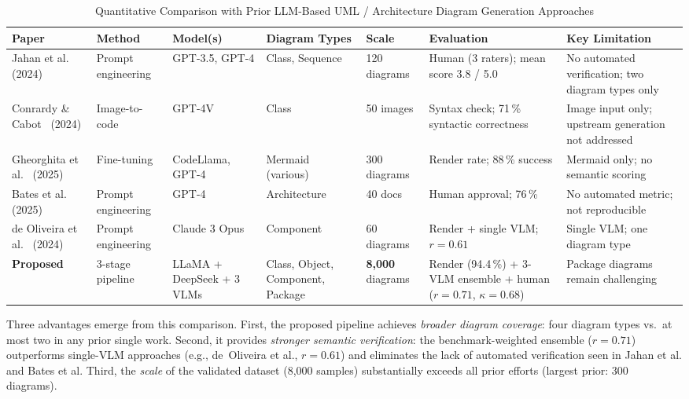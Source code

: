 \documentclass[conference]{IEEEtran}
\begin{document}
\begin{table}[!t]
\caption{Quantitative Comparison with Prior LLM-Based UML / Architecture Diagram Generation Approaches}
\label{tab:comparison}
\renewcommand{\arraystretch}{1.25}
\centering
\begin{tabular}{L{2.4cm}L{2.2cm}L{2.0cm}L{1.8cm}L{1.8cm}L{3.2cm}L{2.4cm}}
\toprule
\textbf{Paper} & \textbf{Method} & \textbf{Model(s)} &
\textbf{Diagram Types} & \textbf{Scale} &
\textbf{Evaluation} & \textbf{Key Limitation} \\
\midrule
Jahan et al.~\cite{jahan2024} (2024) &
  Prompt engineering &
  GPT-3.5, GPT-4 &
  Class, Sequence &
  120 diagrams &
  Human (3 raters); mean score 3.8 / 5.0 &
  No automated verification; two diagram types only \\

Conrardy \& Cabot~\cite{conrardy2024} (2024) &
  Image-to-code &
  GPT-4V &
  Class &
  50 images &
  Syntax check; 71\,\% syntactic correctness &
  Image input only; upstream generation not addressed \\

Gheorghita et al.~\cite{gheorghita2025} (2025) &
  Fine-tuning &
  CodeLlama, GPT-4 &
  Mermaid (various) &
  300 diagrams &
  Render rate; 88\,\% success &
  Mermaid only; no semantic scoring \\

Bates et al.~\cite{bates2025} (2025) &
  Prompt engineering &
  GPT-4 &
  Architecture &
  40 docs &
  Human approval; 76\,\% &
  No automated metric; not reproducible \\

de Oliveira et al.~\cite{deoliveira2024} (2024) &
  Prompt engineering &
  Claude 3 Opus &
  Component &
  60 diagrams &
  Render + single VLM; $r{=}0.61$ &
  Single VLM; one diagram type \\

\midrule
\textbf{Proposed} &
  3-stage pipeline &
  LLaMA + DeepSeek + 3 VLMs &
  Class, Object, Component, Package &
  \textbf{8,000} diagrams &
  Render (94.4\,\%) + 3-VLM ensemble + human ($r{=}0.71$, $\kappa{=}0.68$) &
  Package diagrams remain challenging \\
\bottomrule
\end{tabular}
\end{table}

Three advantages emerge from this comparison. First, the proposed
pipeline achieves \textit{broader diagram coverage}: four diagram
types vs.\ at most two in any prior single work. Second, it provides
\textit{stronger semantic verification}: the benchmark-weighted
ensemble ($r=0.71$) outperforms single-VLM approaches (e.g.,
de~Oliveira et al., $r=0.61$) and eliminates the lack of automated
verification seen in Jahan et al. and Bates et al. Third, the
\textit{scale} of the validated dataset (8,000 samples) substantially
exceeds all prior efforts (largest prior: 300 diagrams).
\end{document}
